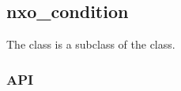 %
%
%
%
%

\subsection{nxo\_condition}
\label{nxo_condition}

The  class is a subclass of the  class.

\subsubsection{API}
